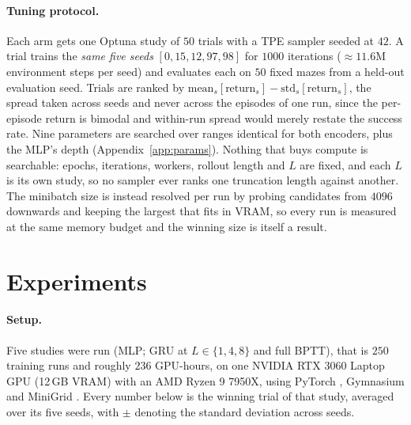 \documentclass{article}
\begin{document}
\paragraph{Tuning protocol.}
\label{sec:hpo}
Each arm gets one Optuna study \citep{optuna} of $50$ trials with a TPE sampler
\citep{tpe} seeded at $42$. A trial trains the \emph{same five seeds}
$[0,15,12,97,98]$ for $1000$ iterations ($\approx 11.6$M environment steps per
seed) and evaluates each on $50$ fixed mazes from a held-out evaluation seed.
Trials are ranked by $\mathrm{mean}_s[\text{return}_s] -
\mathrm{std}_s[\text{return}_s]$, the spread taken across seeds and never across
the episodes of one run, since the per-episode return is bimodal and within-run
spread would merely restate the success rate. Nine parameters are searched over
ranges identical for both encoders, plus the MLP's depth
(Appendix~\ref{app:params}). Nothing that buys compute is searchable: epochs,
iterations, workers, rollout length and $L$ are fixed, and each $L$ is its own
study, so no sampler ever ranks one truncation length against another. The
minibatch size is instead resolved per run by probing candidates from $4096$
downwards and keeping the largest that fits in VRAM, so every run is measured at
the same memory budget and the winning size is itself a result.

\section{Experiments}

\paragraph{Setup.} Five studies were run (MLP; GRU at $L \in \{1,4,8\}$ and full
BPTT), that is $250$ training runs and roughly $236$ GPU-hours, on one NVIDIA
RTX 3060 Laptop GPU (12\,GB VRAM) with an AMD Ryzen 9 7950X, using PyTorch
\citep{pytorch}, Gymnasium \citep{gymnasium} and MiniGrid \citep{minigrid}.
Every number below is the winning trial of that study, averaged over its five
seeds, with $\pm$ denoting the standard deviation across seeds.
\end{document}
